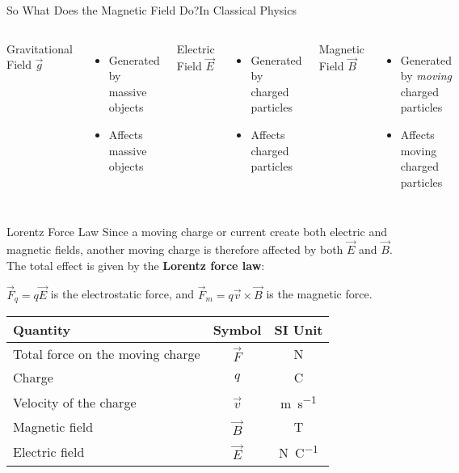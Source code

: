 \documentclass[12pt,aspectratio=169]{beamer}
\begin{document}
\begin{frame}{So What Does the Magnetic Field Do?}{In Classical Physics}
  \begin{columns}
    \begin{center}
      Gravitational Field $\vec g$
    \end{center}
    \begin{itemize}
    \item Generated by massive objects
    \item Affects massive objects
    \end{itemize}

    \begin{center}
      Electric Field $\vec E$
    \end{center}
    \begin{itemize}
    \item Generated by charged particles
    \item Affects charged particles
    \end{itemize}

    \begin{center}
      Magnetic Field $\vec B$
    \end{center}
    \begin{itemize}
    \item Generated by \emph{moving} charged particles
    \item Affects moving charged particles
    \end{itemize}
  \end{columns}
\end{frame}



\begin{frame}{Lorentz Force Law}
  Since a moving charge or current create both electric and magnetic fields,
  another moving charge is therefore affected by both $\vec E$ and $\vec B$.
  The total effect is given by the \textbf{Lorentz force law}:


  \vspace{-.1in}$\vec F_q=q\vec E$ is the electrostatic force, and
  $\vec F_m=q\vec v\times\vec B$ is the magnetic force.
  \begin{center}
    \begin{tabular}{l|c|c}
      \rowcolor{pink}
      \textbf{Quantity} & \textbf{Symbol} & \textbf{SI Unit} \\ \hline
      Total force on the moving charge & $\vec F$ & \si\newton \\
      Charge                 & $q$      & \si\coulomb \\
      Velocity of the charge & $\vec v$ & \si{\metre\per\second} \\
      Magnetic field         & $\vec B$ & \si\tesla \\
      Electric field         & $\vec E$ & \si{\newton\per\coulomb}
    \end{tabular}
  \end{center}
\end{frame}
\end{document}
